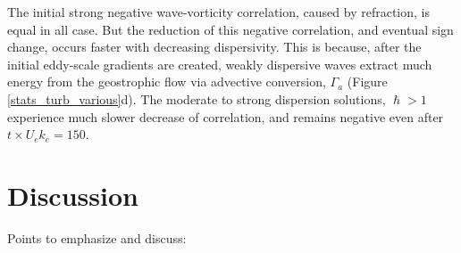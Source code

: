 \documentclass{jfm}
\begin{document}
The initial strong negative wave-vorticity correlation, caused by refraction, is equal
in all case. But the reduction of this negative correlation, and eventual sign change,
occurs faster with decreasing dispersivity. This is because, after the initial
eddy-scale gradients are created, weakly dispersive
waves extract much energy from the geostrophic flow via advective conversion,
$\Gamma_a$ (Figure \ref{stats_turb_various}d). The
moderate to strong dispersion solutions,  $\hslash> 1$ experience much slower
decrease of correlation, and remains negative even after $t\times U_e k_e = 150$.

\section{Discussion}
Points to emphasize and discuss:\\
\end{document}
